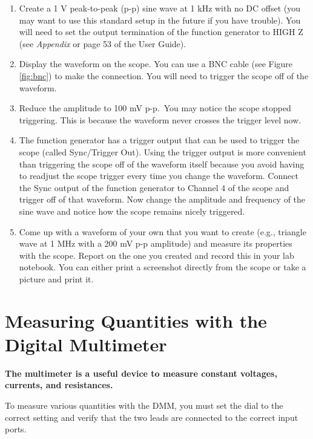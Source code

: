 \documentclass[
]{article}
\begin{document}
\begin{enumerate}
\def\labelenumi{\arabic{enumi}.}
\item
  Create a 1 V peak-to-peak (p-p) sine wave at 1 kHz with no DC offset
  (you may want to use this standard setup in the future if you have
  trouble). You will need to set the output termination of the function
  generator to HIGH Z (see \emph{Appendix} or page 53 of the User
  Guide).
\item
  Display the waveform on the scope. You can use a BNC cable (see Figure
  \ref{fig:bnc}) to make the connection. You will need to trigger the
  scope off of the waveform.
\item
  Reduce the amplitude to 100 mV p-p.~You may notice the scope stopped
  triggering. This is because the waveform never crosses the trigger
  level now.
\item
  The function generator has a trigger output that can be used to
  trigger the scope (called Sync/Trigger Out). Using the trigger output
  is more convenient than triggering the scope off of the waveform
  itself because you avoid having to readjust the scope trigger every
  time you change the waveform. Connect the Sync output of the function
  generator to Channel 4 of the scope and trigger off of that waveform.
  Now change the amplitude and frequency of the sine wave and notice how
  the scope remains nicely triggered.
\item
  Come up with a waveform of your own that you want to create (e.g.,
  triangle wave at 1 MHz with a 200 mV p-p amplitude) and measure its
  properties with the scope. Report on the one you created and record
  this in your lab notebook. You can either print a screenshot directly
  from the scope or take a picture and print it.
\end{enumerate}

\hypertarget{measuring-quantities-with-the-digital-multimeter}{%
\section{Measuring Quantities with the Digital
Multimeter}\label{measuring-quantities-with-the-digital-multimeter}}

\textbf{The multimeter is a useful device to measure constant voltages,
currents, and resistances.}

To measure various quantities with the DMM, you must set the dial to the
correct setting and verify that the two leads are connected to the
correct input ports.
\end{document}
